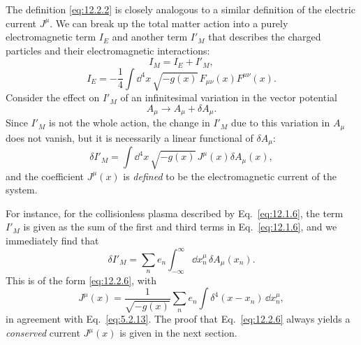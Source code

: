 The definition \eqref{eq:12.2.2} is closely analogous to a similar definition
of the electric current \(J^\mu\). We can break up the total matter action
into a purely electromagnetic term \(I_E\) and another term \(I'_M\) that
describes the charged particles and their electromagnetic interactions:
\begin{equation}
  I_M=I_E+I'_M,
  \tag{12.2.3}\label{eq:12.2.3}
\end{equation}
\begin{equation}
  I_E
  =
  -\frac14\int\dd^4x\,\sqrt{-g(x)}\,
  F_{\mu\nu}(x)F^{\mu\nu}(x).
  \tag{12.2.4}\label{eq:12.2.4}
\end{equation}
Consider the effect on \(I'_M\) of an infinitesimal variation in the vector
potential
\begin{equation}
  A_\mu\longrightarrow A_\mu+\delta A_\mu.
  \tag{12.2.5}\label{eq:12.2.5}
\end{equation}
Since \(I'_M\) is not the whole action, the change in \(I'_M\) due to this
variation in \(A_\mu\) does not vanish, but it is necessarily a linear
functional of \(\delta A_\mu\):
\begin{equation}
  \delta I'_M
  =
  \int\dd^4x\,\sqrt{-g(x)}\,
  J^\mu(x)\delta A_\mu(x),
  \tag{12.2.6}\label{eq:12.2.6}
\end{equation}
and the coefficient \(J^\mu(x)\) is \emph{defined} to be the electromagnetic
current of the system.

For instance, for the collisionless plasma described by
Eq.~\eqref{eq:12.1.6}, the term \(I'_M\) is given as the sum of the first and
third terms in Eq.~\eqref{eq:12.1.6}, and we immediately find that
\[
  \delta I'_M
  =
  \sum_n e_n\int_{-\infty}^{\infty}
  \dd x_n^\mu\,\delta A_\mu(x_n).
\]
This is of the form \eqref{eq:12.2.6}, with
\[
  J^\mu(x)
  =
  \frac1{\sqrt{-g(x)}}\sum_n e_n
  \int\delta^4(x-x_n)\,\dd x_n^\mu,
\]
in agreement with Eq.~\eqref{eq:5.2.13}. The proof that
Eq.~\eqref{eq:12.2.6} always yields a \emph{conserved} current \(J^\mu(x)\)
is given in the next section.
